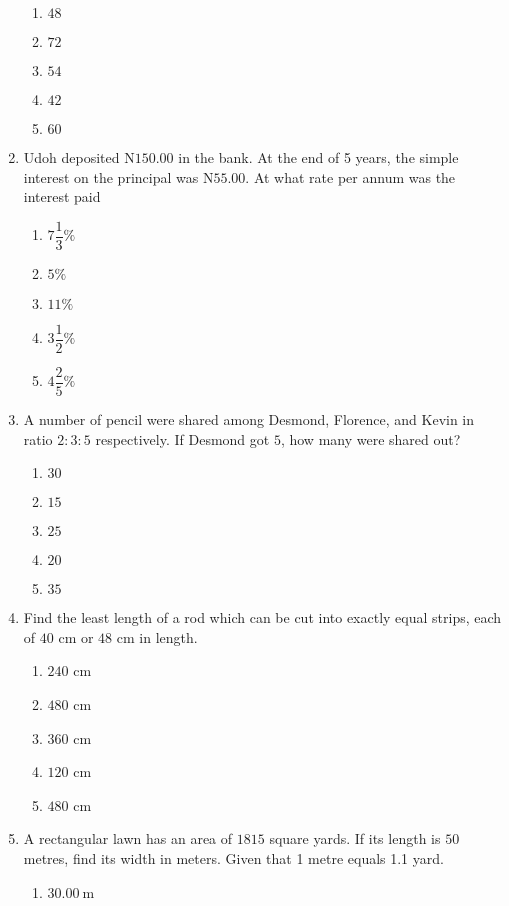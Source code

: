 \begin{multicols}{2}
\begin{enumerate}[label={\arabic*.}]
    \begin{enumerate}[label={\Alph*.}]
    \item \(48\)
    \item \(72\)
    \item \(54\)
    \item \(42\)
    \item \(60\)
    \end{enumerate}
\item Udoh deposited N\(150.00\) in the bank. At the end of 5 years, the simple interest on the principal was N\(55.00\). At what rate per annum was the interest paid 
    \begin{enumerate}[label={\Alph*.}]
    \item \(7\dfrac{1}{3}\%\)
    \item \(5\%\)
    \item \(11\%\)
    \item \(3\dfrac{1}{2}\%\)
    \item \(4\dfrac{2}{5}\%\)
    \end{enumerate}
\item A number of pencil were shared among Desmond, Florence, and Kevin in ratio \(2:3:5\) respectively. If Desmond got \(5\), how many were shared out?
    \begin{enumerate}[label={\Alph*.}]
    \item \(30\)
    \item \(15\)
    \item \(25\)
    \item \(20\)
    \item \(35\)
    \end{enumerate}
\item Find the least length of a rod which can be cut into exactly equal strips, each of \(40\) cm or \(48\) cm in length.
    \begin{enumerate}[label={\Alph*.}]
    \item \(240 \) cm
    \item \(480\) cm
    \item \(360\) cm
    \item \(120\) cm
    \item \(480\) cm
    \end{enumerate}
\item A rectangular lawn has an area of \(1815\) square yards. If its length is \(50\) metres, find its width in meters. Given that 1 metre equals 1.1 yard.
    \begin{enumerate}[label={\Alph*.}]
    \item \(\SI{30.00}{\meter}\)

\end{enumerate}
\end{enumerate}
\end{multicols}
